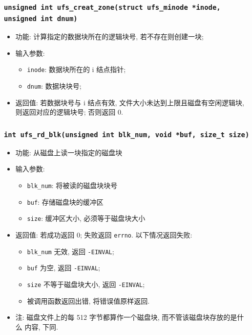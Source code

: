 \documentclass[nofonts]{ctexart}
\begin{document}
  \subsubsection[\texttt{ufs\_creat\_zone}]{\texttt{unsigned int ufs\_creat\_zone(struct ufs\_minode *inode, unsigned int dnum)}}
  \begin{itemize}
\item
  功能: 计算指定的数据块所在的逻辑块号, 若不存在则创建一块;
\item
  输入参数:

  \begin{itemize}
  \item
    \texttt{inode}: 数据块所在的 i 结点指针;
  \item
    \texttt{dnum}: 数据块块号;
  \end{itemize}
\item
  返回值: 若数据块号与 i 结点有效, 文件大小未达到上限且磁盘有空闲逻辑块,
  则返回对应的逻辑块号; 否则返回 0.
  \end{itemize}
  \subsubsection[\texttt{ufs\_rd\_blk}]{\texttt{int ufs\_rd\_blk(unsigned int blk\_num, void *buf, size\_t size)}}
  \begin{itemize}
\item
  功能: 从磁盘上读一块指定的磁盘块
\item
  输入参数:

  \begin{itemize}
  \item
    \texttt{blk\_num}: 将被读的磁盘块块号
  \item
    \texttt{buf}: 存储磁盘块的缓冲区
  \item
    \texttt{size}: 缓冲区大小, 必须等于磁盘块大小
  \end{itemize}
\item
  返回值: 若成功返回 0; 失败返回 \texttt{errno}. 以下情况返回失败:

  \begin{itemize}
  \item
    \texttt{blk\_num} 无效, 返回 \texttt{-EINVAL};
  \item
    \texttt{buf} 为空, 返回 \texttt{-EINVAL};
  \item
    \texttt{size} 不等于磁盘块大小, 返回 \texttt{-EINVAL};
  \item
    被调用函数返回出错, 将错误值原样返回.
  \end{itemize}
\item
  注: 磁盘文件上的每 512 字节都算作一个磁盘块,
  而不管该磁盘块存放的是什么 内容, 下同.
  \end{itemize}
\end{document}
